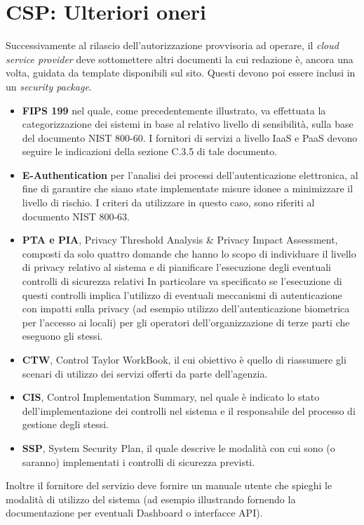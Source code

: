 \documentclass[../main.tex]{subfiles}
\begin{document}
\section{CSP: Ulteriori oneri }
Successivamente al rilascio dell'autorizzazione provvisoria ad operare, il \textit{cloud service provider} deve sottomettere altri documenti la cui redazione è, ancora una volta, guidata da template disponibili sul sito. Questi devono poi essere inclusi in un \textit{security package}.
\begin{itemize}
    \item \textbf{FIPS 199} nel quale, come precedentemente illustrato, va effettuata la categorizzazione dei sistemi in base al relativo livello di sensibilità, sulla base del documento NIST 800-60. I fornitori di servizi a livello IaaS e PaaS devono seguire le indicazioni della sezione C.3.5 di tale documento.
    \item \textbf{E-Authentication} per l'analisi dei processi dell'autenticazione elettronica, al fine di garantire che siano state implementate misure idonee a minimizzare il livello di rischio. I criteri da utilizzare in questo caso, sono riferiti al documento NIST 800-63.
    \item \textbf{PTA e PIA}, Privacy Threshold Analysis \& Privacy Impact Assessment, composti da solo quattro domande che hanno lo scopo di individuare il livello di privacy relativo al sistema e di pianificare l'esecuzione degli eventuali controlli di sicurezza relativi In particolare va specificato se l'esecuzione di questi controlli implica l'utilizzo di eventuali meccanismi di autenticazione con impatti sulla privacy (ad esempio utilizzo dell'autenticazione biometrica per l'accesso ai locali) per gli operatori dell'organizzazione di terze parti che eseguono gli stessi.
    \item \textbf{CTW}, Control Taylor WorkBook, il cui obiettivo è quello di riassumere gli scenari di utilizzo dei servizi offerti da parte dell'agenzia.
    \item \textbf{CIS}, Control Implementation Summary, nel quale è indicato lo stato dell'implementazione dei controlli nel sistema e il responsabile del processo di gestione degli stessi.
    \item \textbf{SSP}, System Security Plan, il quale descrive le modalità con cui sono (o saranno) implementati i controlli di sicurezza previsti.
\end{itemize}
Inoltre il fornitore del servizio deve fornire un manuale utente che spieghi le modalità di utilizzo del sistema (ad esempio illustrando fornendo la documentazione per eventuali Dashboard o interfacce API).
\end{document}
